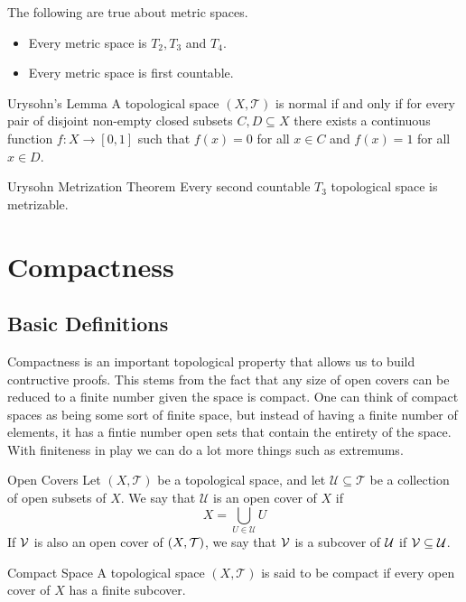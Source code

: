 \documentclass[a4paper]{article}
\begin{document}
\begin{prp}{}{} The following are true about metric spaces. 
\begin{itemize}
\item Every metric space is $T_2,T_3$ and $T_4$. 
\item Every metric space is first countable. 
\end{itemize}
\end{prp}

\begin{thm}{Urysohn's Lemma}{} A topological space $(X,\mathcal{T})$ is normal if and only if for every pair of disjoint non-empty closed subsets $C,D\subseteq X$ there exists a continuous function $f:X\to[0,1]$ such that $f(x)=0$ for all $x\in C$ and $f(x)=1$ for all $x\in D$. 
\end{thm}

\begin{thm}{Urysohn Metrization Theorem}{} Every second countable $T_3$ topological space is metrizable. 
\end{thm}

\pagebreak
\section{Compactness}
\subsection{Basic Definitions}
Compactness is an important topological property that allows us to build contructive proofs. This stems from the fact that any size of open covers can be reduced to a finite number given the space is compact. One can think of compact spaces as being some sort of finite space, but instead of having a finite number of elements, it has a fintie number open sets that contain the entirety of the space. With finiteness in play we can do a lot more things such as extremums. 

\begin{defn}{Open Covers}{} Let $(X,\mathcal{T})$ be a topological space, and let $\mathcal{U}\subseteq\mathcal{T}$ be a collection of open subsets of $X$. We say that $\mathcal{U}$ is an open cover of $X$ if $$X=\bigcup_{U\in\mathcal{U}}U$$ If $\mathcal{V}$ is also an open cover of $(X,\mathcal{T})$, we say that $\mathcal{V}$ is a subcover of $\mathcal{U}$ if $\mathcal{V}\subseteq\mathcal{U}$. 
\end{defn}

\begin{defn}{Compact Space}{} A topological space $(X,\mathcal{T})$ is said to be compact if every open cover of $X$ has a finite subcover. 
\end{defn}
\end{document}
